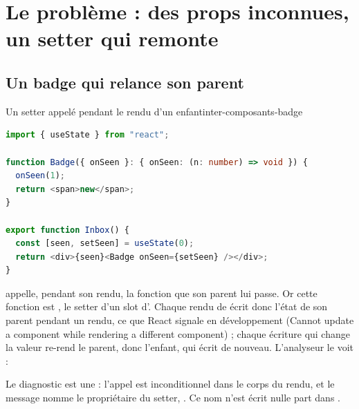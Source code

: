 \section{Le problème : des props inconnues, un setter qui remonte}
\label{sec:inter-composants-probleme}

\subsection{Un badge qui relance son parent}

\begin{exemple}{Un setter appelé pendant le rendu d'un enfant}{inter-composants-badge}
\begin{lstlisting}[language=TypeScript,caption={\file{/tmp/ch16/intro.tsx}},label={lst:inter-composants-intro}]
import { useState } from "react";

function Badge({ onSeen }: { onSeen: (n: number) => void }) {
  onSeen(1);
  return <span>new</span>;
}

export function Inbox() {
  const [seen, setSeen] = useState(0);
  return <div>{seen}<Badge onSeen={setSeen} /></div>;
}
\end{lstlisting}
\end{exemple}

 appelle, pendant son rendu, la fonction que son parent lui passe. Or cette
fonction est , le setter d'un slot d'. Chaque rendu de 
écrit donc l'état de son parent pendant un rendu, ce que React signale en développement
(\og Cannot update a component while rendering a different component\fg) ; chaque écriture qui
change la valeur re-rend le parent, donc l'enfant, qui écrit de nouveau. L'analyseur le voit :


Le diagnostic est une \Error{} : l'appel est inconditionnel dans le corps du rendu, et le
message nomme le propriétaire du setter, . Ce nom n'est écrit nulle part dans
.

